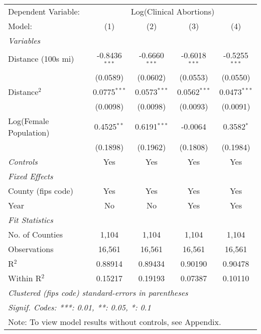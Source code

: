 \begingroup
\centering
\begin{tabular}{lcccc}
   \tabularnewline \midrule \midrule
   Dependent Variable: & \multicolumn{4}{c}{Log(Clinical Abortions)}\\
   Model:                     & (1)             & (2)             & (3)             & (4)\\  
   \midrule
   \emph{Variables}\\
   Distance (100s mi)         & -0.8436$^{***}$ & -0.6660$^{***}$ & -0.6018$^{***}$ & -0.5255$^{***}$\\   
                              & (0.0589)        & (0.0602)        & (0.0553)        & (0.0550)\\   
   Distance$^2$               & 0.0775$^{***}$  & 0.0573$^{***}$  & 0.0562$^{***}$  & 0.0473$^{***}$\\   
                              & (0.0098)        & (0.0098)        & (0.0093)        & (0.0091)\\   
   Log(Female Population)           & 0.4525$^{**}$   & 0.6191$^{***}$  & -0.0064         & 0.3582$^{*}$\\   
                              & (0.1898)        & (0.1962)        & (0.1808)        & (0.1984)\\  
   \midrule
   \emph{Controls}            & Yes             & Yes             & Yes             & Yes\\
   \midrule
   \emph{Fixed Effects}\\
   County (fips code)                 & Yes             & Yes             & Yes             & Yes\\  
   Year                       & No                & No                & Yes             & Yes\\  
   \midrule
   \emph{Fit Statistics}\\
   No. of Counties            & 1,104           & 1,104
   & 1,104           & 1,104\\
   Observations               & 16,561          & 16,561          & 16,561          & 16,561\\  
   R$^2$                      & 0.88914         & 0.89434         & 0.90190         & 0.90478\\  
   Within R$^2$               & 0.15217         & 0.19193         & 0.07387         & 0.10110\\  
   \midrule \midrule
   \multicolumn{5}{l}{\emph{Clustered (fips code) standard-errors in parentheses}}\\
   \multicolumn{5}{l}{\emph{Signif. Codes: ***: 0.01, **: 0.05, *: 0.1}}\\
   \multicolumn{5}{l}{Note: To view model results without controls, see Appendix.}\\
\end{tabular}
\par\endgroup